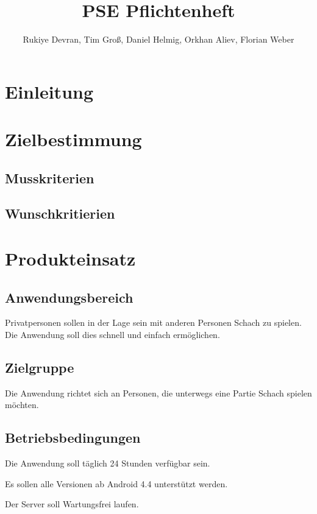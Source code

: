 \documentclass[parskip=full]{scrartcl}
\title{PSE Pflichtenheft}
\author{Rukiye Devran, Tim Groß, Daniel Helmig, Orkhan Aliev, Florian Weber}
\begin{document}
	\begin{titlepage}
	\maketitle	
	\tableofcontents
	
	\end{titlepage}
\section{Einleitung}
\section{Zielbestimmung}
\subsection{Musskriterien}
\subsection{Wunschkritierien}
\section{Produkteinsatz}
	\subsection{Anwendungsbereich}
		
			Privatpersonen sollen in der Lage sein mit anderen Personen Schach zu spielen. Die Anwendung soll dies schnell und einfach ermöglichen.	
		
	\subsection{Zielgruppe}
		
			Die Anwendung richtet sich an Personen, die unterwegs eine Partie Schach spielen möchten.
		
	\subsection{Betriebsbedingungen}
		\begin{description}
			\item Die Anwendung soll täglich 24 Stunden verfügbar sein.
			\item Es sollen alle Versionen ab Android 4.4 unterstützt werden.
			\item Der Server soll Wartungsfrei laufen.	
		\end{description}
\end{document}
